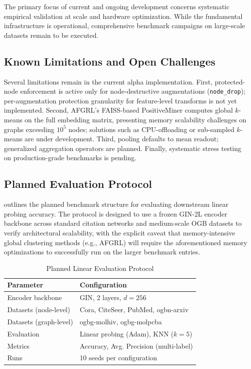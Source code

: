 \documentclass[conference]{IEEEtran}
\begin{document}
The primary focus of current and ongoing development concerns systematic empirical validation at scale and hardware optimization. While the fundamental infrastructure is operational, comprehensive benchmark campaigns on large-scale datasets remain to be executed.

\subsection{Known Limitations and Open Challenges}
Several limitations remain in the current alpha implementation. First, protected-node enforcement is active only for node-destructive augmentations (\texttt{node\_drop}); per-augmentation protection granularity for feature-level transforms is not yet implemented. Second, AFGRL's FAISS-based PositiveMiner computes global $k$-means on the full embedding matrix, presenting memory scalability challenges on graphs exceeding $10^5$ nodes; solutions such as CPU-offloading or sub-sampled $k$-means are under development. Third, pooling defaults to mean readout; generalized aggregation operators are planned. Finally, systematic stress testing on production-grade benchmarks is pending.

\subsection{Planned Evaluation Protocol}
 outlines the planned benchmark structure for evaluating downstream linear probing accuracy. The protocol is designed to use a frozen GIN-2L encoder backbone across standard citation networks and medium-scale OGB datasets \cite{ogb} to verify architectural scalability, with the explicit caveat that memory-intensive global clustering methods (e.g., AFGRL) will require the aforementioned memory optimizations to successfully run on the larger benchmark entries.

\begin{table}[htbp]
\centering
\caption{Planned Linear Evaluation Protocol}
\label{tab:accuracy}
\begin{tabular}{@{}ll@{}}
\toprule
\textbf{Parameter} & \textbf{Configuration} \\ \midrule
Encoder backbone & GIN, 2 layers, $d{=}256$ \\
Datasets (node-level) & Cora, CiteSeer, PubMed, ogbn-arxiv \\
Datasets (graph-level) & ogbg-molhiv, ogbg-molpcba \\
Evaluation & Linear probing (Adam), KNN ($k{=}5$) \\
Metrics & Accuracy, Avg. Precision (multi-label) \\
Runs & 10 seeds per configuration \\ \bottomrule
\end{tabular}
\end{table}
\end{document}
